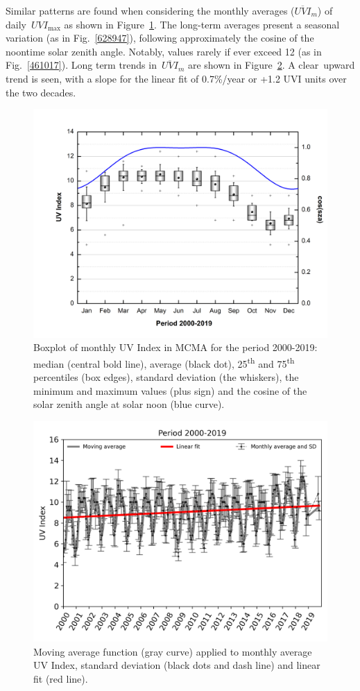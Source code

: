 \documentclass[10pt]{article}
\begin{document}
Similar patterns are found when considering the monthly averages
(\(\overline{UVI}_m\)) of daily~\(UVI_{\max}\) as shown in
Figure~{\ref{310112}}. The long-term averages present a
seasonal variation (as in Fig.~{\ref{628947}}),
following approximately the cosine of the noontime solar zenith angle.
Notably, values rarely if ever exceed 12 (as in
Fig.~{\ref{461017}}). Long term trends
in~\(\overline{UVI}_m\) are shown in
Figure~{\ref{185758}}. A clear~upward trend is seen,
with a slope for the linear fit of 0.7\%/year or +1.2 UVI units over the
two decades.
\begin{figure}[H]
  \begin{center}
    \includegraphics[width=0.70\columnwidth]{figures/Boxplotcos/Boxplotcos}
    \caption{{Boxplot of monthly UV Index in MCMA for the period 2000-2019: median
          (central bold line), average (black dot), 25\textsuperscript{th} and
          75\textsuperscript{th} percentiles (box edges), standard deviation (the
          whiskers), the minimum and maximum values (plus sign) and the cosine of
          the solar zenith angle at solar noon (blue curve).
            {\label{310112}}%
        }}
  \end{center}
\end{figure}
\begin{figure}[H]
  \begin{center}
    \includegraphics[width=0.70\columnwidth]{figures/CloudDaily/UVyearlyError}
    \caption{{Moving average function (gray curve) applied to monthly average UV
          Index, standard deviation (black dots and dash line) and linear fit (red
          line).
            {\label{185758}}%
        }}
  \end{center}
\end{figure}
\end{document}
